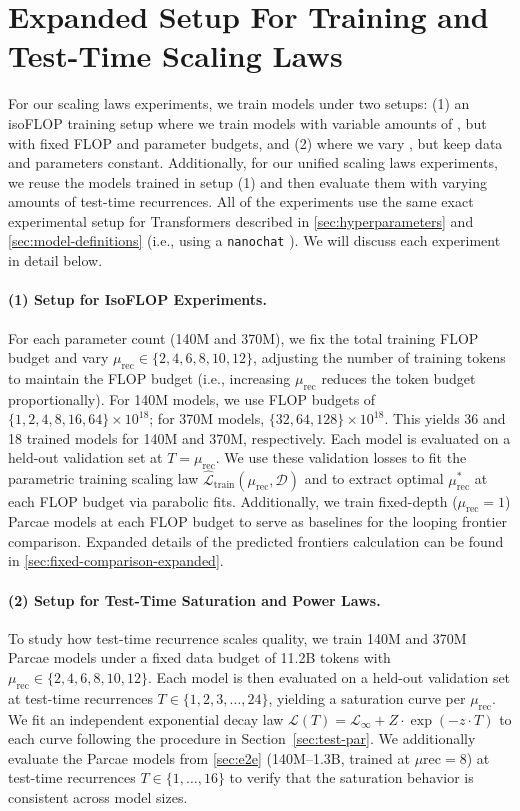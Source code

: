 \section{Expanded Setup For Training and Test-Time Scaling Laws}
\label{sec:scaling-laws-setup}


For our scaling laws experiments, we train models under two setups: (1) an isoFLOP training setup where we train models with variable amounts of \meanrecurrence, but with fixed FLOP and parameter budgets, and (2) where we vary \meanrecurrence, but keep data and parameters constant. Additionally, for our unified scaling laws experiments, we reuse the models trained in setup (1) and then evaluate them with varying amounts of test-time recurrences. All of the experiments use the same exact experimental setup for Transformers described in \cref{sec:hyperparameters} and \cref{sec:model-definitions} (i.e., using a \texttt{nanochat} \citep{nanochat}). We will discuss each experiment in detail below.


\paragraph{(1) Setup for IsoFLOP Experiments.} For each parameter count (140M and 370M), we fix the total training FLOP budget and vary $\mu_{\text{rec}} \in \{2, 4, 6, 8, 10, 12\}$, adjusting the number of training tokens to maintain the FLOP budget (i.e., increasing $\mu_{\text{rec}}$ reduces the token budget proportionally). For 140M models, we use FLOP budgets of $\{1, 2, 4, 8, 16, 64\} \times 10^{18}$; for 370M models, $\{32, 64, 128\} \times 10^{18}$.
This yields 36 and 18 trained models for 140M and 370M, respectively. Each model is evaluated on a held-out validation set at $T = \mu_{\text{rec}}$. 
We use these validation losses to fit the parametric training scaling law $\widehat{\mathcal{L}}_{\text{train}}(\mu_{\text{rec}}, \mathcal{D})$ and to extract optimal $\mu_{\text{rec}}^*$ at each FLOP budget via parabolic fits. 
Additionally, we train fixed-depth ($\mu_{\text{rec}} = 1$) Parcae models at each FLOP budget to serve as baselines for the looping frontier comparison. Expanded details of the predicted frontiers calculation can be found in \cref{sec:fixed-comparison-expanded}.


\paragraph{(2) Setup for Test-Time Saturation and Power Laws.} To study how test-time recurrence scales quality, we train 140M and 370M Parcae models under a fixed data budget of 11.2B tokens with $\mu_{\text{rec}} \in \{2, 4, 6, 8, 10, 12\}$. Each model is then evaluated on a held-out validation set at test-time recurrences $T \in \{1, 2, 3, \ldots, 24\}$, yielding a saturation curve per $\mu_{\text{rec}}$. We fit an independent exponential decay law $\mathcal{L}(T) = \mathcal{L}_\infty + Z \cdot \exp(-z \cdot T)$ to each curve following the procedure in Section~\ref{sec:test-par}. We additionally evaluate the Parcae models from \cref{sec:e2e} (140M--1.3B, trained at $\mu{\text{rec}}=8$) at test-time recurrences $T \in \{1, \ldots, 16\}$ to verify that the saturation behavior is consistent across model sizes.


